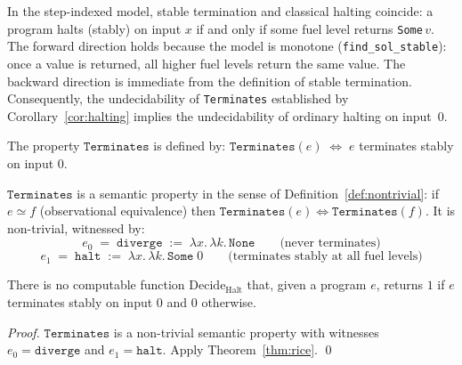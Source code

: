 \documentclass{lmcs}
\begin{document}
\begin{rem}
In the step-indexed model, stable termination and classical halting coincide:
a program halts (stably) on input $x$ if and only if some fuel level returns
\texttt{Some}$\,v$.  The forward direction holds because the model is monotone
(\texttt{find\_sol\_stable}): once a value is returned, all higher fuel
levels return the same value.  The backward direction is immediate from the
definition of stable termination.
Consequently, the undecidability of \texttt{Terminates} established by
Corollary~\ref{cor:halting} implies the undecidability of ordinary halting
on input~$0$.
\end{rem}

\begin{defi}[Terminates]
The property $\mathtt{Terminates}$ is defined by:
$\mathtt{Terminates}(e) \;\Leftrightarrow\; e$ terminates stably on
input $0$.
\end{defi}

$\mathtt{Terminates}$ is a semantic property in the sense of
Definition~\ref{def:nontrivial}: if $e \simeq f$ (observational equivalence)
then $\mathtt{Terminates}(e) \Leftrightarrow \mathtt{Terminates}(f)$.
It is non-trivial, witnessed by:
\[
  e_0 \;=\; \mathtt{diverge} \;:=\; \lambda x.\,\lambda k.\,\mathtt{None}
  \qquad \text{(never terminates)}
\]
\[
  e_1 \;=\; \mathtt{halt} \;:=\; \lambda x.\,\lambda k.\,\mathtt{Some}\;0
  \qquad \text{(terminates stably at all fuel levels)}
\]

\begin{cor}
\label{cor:halting}
There is no computable function $\mathrm{Decide}_{\mathrm{Halt}}$ that,
given a program $e$, returns $1$ if $e$ terminates stably on input $0$
and $0$ otherwise.
\end{cor}

\begin{proof}
$\mathtt{Terminates}$ is a non-trivial semantic property with witnesses
$e_0 = \mathtt{diverge}$ and $e_1 = \mathtt{halt}$. Apply
Theorem~\ref{thm:rice}. \qed
\end{proof}
\end{document}
